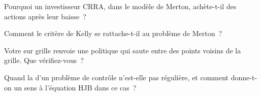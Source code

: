 \begin{interviewq}\label{iq:qm:stochastic-control:3}
Pourquoi un investisseur CRRA, dans le modèle de Merton, achète-t-il des actions après leur baisse~?
\end{interviewq}

\begin{interviewq}\label{iq:qm:stochastic-control:4}
Comment le critère de Kelly se rattache-t-il au problème de Merton~?
\end{interviewq}

\begin{interviewq}\label{iq:qm:stochastic-control:5}
Votre  sur grille renvoie une politique qui saute entre des points voisins de la grille. Que vérifiez-vous~?
\end{interviewq}

\begin{interviewq}\label{iq:qm:stochastic-control:6}
Quand la  d'un problème de contrôle n'est-elle pas régulière, et comment donne-t-on un sens à l'équation HJB dans ce cas~?
\end{interviewq}
